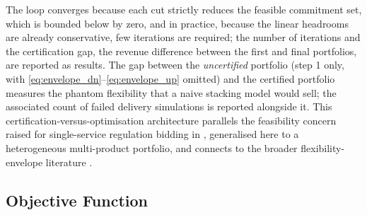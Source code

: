 \documentclass[lettersize,journal]{IEEEtran}
\begin{document}
The loop converges because each cut strictly reduces the feasible commitment set, which is bounded below by zero, and in practice, because the linear headrooms are already conservative, few iterations are required; the number of iterations and the certification gap, the revenue difference between the first and final portfolios, are reported as results. The gap between the \emph{uncertified} portfolio (step 1 only, with \eqref{eq:envelope_dn}--\eqref{eq:envelope_up} omitted) and the certified portfolio measures the phantom flexibility that a naive stacking model would sell; the associated count of failed delivery simulations is reported alongside it. This certification-versus-optimisation architecture parallels the feasibility concern raised for single-service regulation bidding in \cite{fan2026harnessing}, generalised here to a heterogeneous multi-product portfolio, and connects to the broader flexibility-envelope literature \cite{nosair2015flexibility,riaz2022modelling}.

\subsection{Objective Function}\label{sec:objective}
\end{document}
